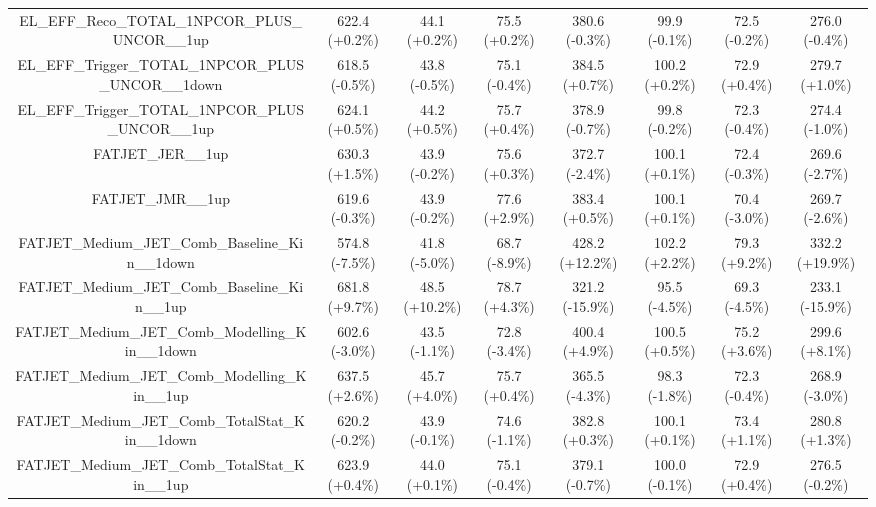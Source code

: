 \begin{table}[htbp!]
\begin{tiny}
\begin{center}
\begin{tabular}{c|c|c|c||c|c|c|c}
EL\_EFF\_Reco\_TOTAL\_1NPCOR\_PLUS\_UNCOR\_\_1up             & 622.4     (+0.2\%) & 44.1      (+0.2\%) & 75.5      (+0.2\%) & 380.6     (-0.3\%) & 99.9      (-0.1\%) & 72.5      (-0.2\%) & 276.0     (-0.4\%) \\ 
EL\_EFF\_Trigger\_TOTAL\_1NPCOR\_PLUS\_UNCOR\_\_1down        & 618.5     (-0.5\%) & 43.8      (-0.5\%) & 75.1      (-0.4\%) & 384.5     (+0.7\%) & 100.2     (+0.2\%) & 72.9      (+0.4\%) & 279.7     (+1.0\%) \\ 
EL\_EFF\_Trigger\_TOTAL\_1NPCOR\_PLUS\_UNCOR\_\_1up          & 624.1     (+0.5\%) & 44.2      (+0.5\%) & 75.7      (+0.4\%) & 378.9     (-0.7\%) & 99.8      (-0.2\%) & 72.3      (-0.4\%) & 274.4     (-1.0\%) \\ 
FATJET\_JER\_\_1up                                           & 630.3     (+1.5\%) & 43.9      (-0.2\%) & 75.6      (+0.3\%) & 372.7     (-2.4\%) & 100.1     (+0.1\%) & 72.4      (-0.3\%) & 269.6     (-2.7\%) \\ 
FATJET\_JMR\_\_1up                                           & 619.6     (-0.3\%) & 43.9      (-0.2\%) & 77.6      (+2.9\%) & 383.4     (+0.5\%) & 100.1     (+0.1\%) & 70.4      (-3.0\%) & 269.7     (-2.6\%) \\ 
FATJET\_Medium\_JET\_Comb\_Baseline\_Kin\_\_1down            & 574.8     (-7.5\%) & 41.8      (-5.0\%) & 68.7      (-8.9\%) & 428.2     (+12.2\%) & 102.2     (+2.2\%) & 79.3      (+9.2\%) & 332.2     (+19.9\%) \\ 
FATJET\_Medium\_JET\_Comb\_Baseline\_Kin\_\_1up              & 681.8     (+9.7\%) & 48.5      (+10.2\%) & 78.7      (+4.3\%) & 321.2     (-15.9\%) & 95.5      (-4.5\%) & 69.3      (-4.5\%) & 233.1     (-15.9\%) \\ 
FATJET\_Medium\_JET\_Comb\_Modelling\_Kin\_\_1down           & 602.6     (-3.0\%) & 43.5      (-1.1\%) & 72.8      (-3.4\%) & 400.4     (+4.9\%) & 100.5     (+0.5\%) & 75.2      (+3.6\%) & 299.6     (+8.1\%) \\ 
FATJET\_Medium\_JET\_Comb\_Modelling\_Kin\_\_1up             & 637.5     (+2.6\%) & 45.7      (+4.0\%) & 75.7      (+0.4\%) & 365.5     (-4.3\%) & 98.3      (-1.8\%) & 72.3      (-0.4\%) & 268.9     (-3.0\%) \\ 
FATJET\_Medium\_JET\_Comb\_TotalStat\_Kin\_\_1down           & 620.2     (-0.2\%) & 43.9      (-0.1\%) & 74.6      (-1.1\%) & 382.8     (+0.3\%) & 100.1     (+0.1\%) & 73.4      (+1.1\%) & 280.8     (+1.3\%) \\ 
FATJET\_Medium\_JET\_Comb\_TotalStat\_Kin\_\_1up             & 623.9     (+0.4\%) & 44.0      (+0.1\%) & 75.1      (-0.4\%) & 379.1     (-0.7\%) & 100.0     (-0.1\%) & 72.9      (+0.4\%) & 276.5     (-0.2\%) \\ 

\end{tabular}
\end{center}
\end{tiny}
\end{table}
